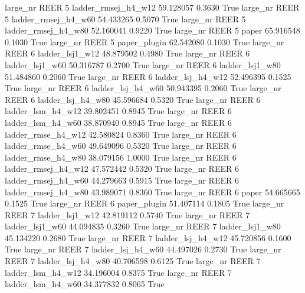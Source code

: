   large_nr     REER                 5 ladder_rmsej_h4_w12   59.128057      0.3630    True
  large_nr     REER                 5 ladder_rmsej_h4_w60   54.433265      0.5070    True
  large_nr     REER                 5 ladder_rmsej_h4_w80   52.160041      0.9220    True
  large_nr     REER                 5               paper   65.916548      0.1030    True
  large_nr     REER                 5        paper_plugin   62.542080      0.1030    True
  large_nr     REER                 6     ladder_lsj1_w12   48.879502      0.4980    True
  large_nr     REER                 6     ladder_lsj1_w60   50.316787      0.2700    True
  large_nr     REER                 6     ladder_lsj1_w80   51.484860      0.2060    True
  large_nr     REER                 6   ladder_lsj_h4_w12   52.496395      0.1525    True
  large_nr     REER                 6   ladder_lsj_h4_w60   50.943395      0.2060    True
  large_nr     REER                 6   ladder_lsj_h4_w80   45.596684      0.5320    True
  large_nr     REER                 6   ladder_lsm_h4_w12   39.802451      0.8945    True
  large_nr     REER                 6   ladder_lsm_h4_w60   38.870940      0.8945    True
  large_nr     REER                 6  ladder_rmse_h4_w12   42.580824      0.8360    True
  large_nr     REER                 6  ladder_rmse_h4_w60   49.649096      0.5320    True
  large_nr     REER                 6  ladder_rmse_h4_w80   38.079156      1.0000    True
  large_nr     REER                 6 ladder_rmsej_h4_w12   47.572442      0.5320    True
  large_nr     REER                 6 ladder_rmsej_h4_w60   44.279663      0.5915    True
  large_nr     REER                 6 ladder_rmsej_h4_w80   43.989071      0.8360    True
  large_nr     REER                 6               paper   54.665665      0.1525    True
  large_nr     REER                 6        paper_plugin   51.407114      0.1805    True
  large_nr     REER                 7     ladder_lsj1_w12   42.819112      0.5740    True
  large_nr     REER                 7     ladder_lsj1_w60   44.094835      0.3260    True
  large_nr     REER                 7     ladder_lsj1_w80   45.134220      0.2680    True
  large_nr     REER                 7   ladder_lsj_h4_w12   45.720856      0.1600    True
  large_nr     REER                 7   ladder_lsj_h4_w60   44.497026      0.2730    True
  large_nr     REER                 7   ladder_lsj_h4_w80   40.706598      0.6125    True
  large_nr     REER                 7   ladder_lsm_h4_w12   34.196004      0.8375    True
  large_nr     REER                 7   ladder_lsm_h4_w60   34.377832      0.8065    True
